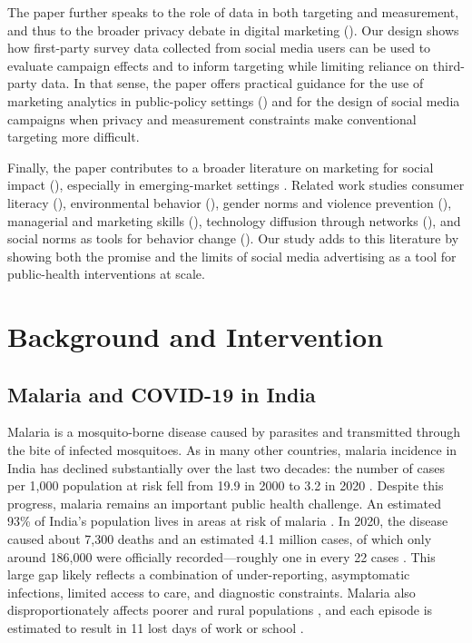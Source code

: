 The paper further speaks to the role of data in both targeting and measurement, and thus to the broader privacy debate in digital marketing (\citealt{acquisti2016economics, tucker2018privacy}). Our design shows how first-party survey data collected from social media users can be used to evaluate campaign effects and to inform targeting while limiting reliance on third-party data. In that sense, the paper offers practical guidance for the use of marketing analytics in public-policy settings (\citealt{davis2021future}) and for the design of social media campaigns when privacy and measurement constraints make conventional targeting more difficult. 

Finally, the paper contributes to a broader literature on marketing for social impact (\citealt{chandy2021better, kotler1971social}), especially in emerging-market settings \citep{narasimhan2015marketing}. Related work studies consumer literacy (\citealt{viswanathan2021marketplace}), environmental behavior (\citealt{sun2021buy, zhang2021social, brecko2023pro}), gender norms and violence prevention (\citealt{donati2022}), managerial and marketing skills (\citealt{anderson2018pathways, bulte2017gender}), technology diffusion through networks (\citealt{miller2015learning}), and social norms as tools for behavior change (\citealt{burchell2013marketing}). Our study adds to this literature by showing both the promise and the limits of social media advertising as a tool for public-health interventions at scale.






\section{Background and Intervention}

\subsection{Malaria and COVID-19 in India}

Malaria is a mosquito-borne disease caused by parasites and transmitted through the bite of infected mosquitoes. As in many other countries, malaria incidence in India has declined substantially over the last two decades: the number of cases per 1,000 population at risk fell from 19.9 in 2000 to 3.2 in 2020 \citep{worldbankdata2022}. Despite this progress, malaria remains an important public health challenge. An estimated 93\% of India’s population lives in areas at risk of malaria \citep{world2018malaria}. In 2020, the disease caused about 7,300 deaths and an estimated 4.1 million cases, of which only around 186,000 were officially recorded---roughly one in every 22 cases \citep{world2021malaria}. This large gap likely reflects a combination of under-reporting, asymptomatic infections, limited access to care, and diagnostic constraints. Malaria also disproportionately affects poorer and rural populations \citep{dev2004physiographic}, and each episode is estimated to result in 11 lost days of work or school \citep{singh2019economic}.

